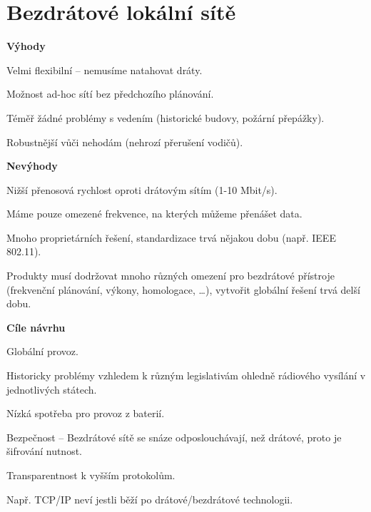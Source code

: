 
\section{Bezdrátové lokální sítě}

\begin{compactitem}
    \item \textbf{Výhody} \begin{compactitem}
        \item Velmi flexibilní -- nemusíme natahovat dráty.
        \item Možnost ad-hoc sítí bez předchozího plánování.
        \item Téměř žádné problémy s vedením (historické budovy, požární přepážky).
        \item Robustnější vůči nehodám (nehrozí přerušení vodičů).
    \end{compactitem}

    \item \textbf{Nevýhody} \begin{compactitem}
        \item Nižší přenosová rychlost oproti drátovým sítím (1-10 Mbit/s). \begin{compactitem}
            \item Máme pouze omezené frekvence, na kterých můžeme přenášet data.
        \end{compactitem}
        \item Mnoho proprietárních řešení, standardizace trvá nějakou dobu (např. IEEE 802.11).
        \item Produkty musí dodržovat mnoho různých omezení pro bezdrátové přístroje (frekvenční plánování, výkony, homologace, \dots), vytvořit globální řešení trvá delší dobu.
    \end{compactitem}

    \item \textbf{Cíle návrhu} \begin{compactitem}
        \item Globální provoz. \begin{compactitem}
            \item Historicky problémy vzhledem k různým legislativám ohledně rádiového vysílání v jednotlivých státech.
        \end{compactitem}
        \item Nízká spotřeba pro provoz z baterií.
        \item Bezpečnost -- Bezdrátové sítě se snáze odposlouchávají, než drátové, proto je šifrování nutnost.
        \item Transparentnost k vyšším protokolům. \begin{compactitem}
            \item Např. TCP/IP neví jestli běží po drátové/bezdrátové technologii.
        \end{compactitem}
    \end{compactitem}


\end{compactitem}

